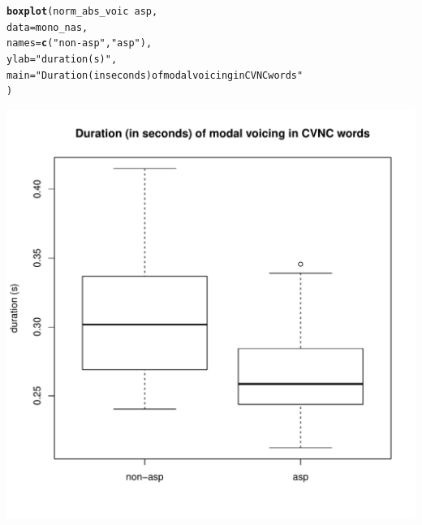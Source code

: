 \documentclass[a4paper,11pt]{article}\usepackage[]{graphicx}\usepackage[]{color}
\makeatletter
\def\maxwidth{ %
  \ifdim\Gin@nat@width>\linewidth
    \linewidth
  \else
    \Gin@nat@width
  \fi
}
\newcommand{\hlstr}[1]{\textcolor[rgb]{0.192,0.494,0.8}{#1}}%
\newcommand{\hlopt}[1]{\textcolor[rgb]{0,0,0}{#1}}%
\newcommand{\hlstd}[1]{\textcolor[rgb]{0.345,0.345,0.345}{#1}}%
\newcommand{\hlkwc}[1]{\textcolor[rgb]{0.333,0.667,0.333}{#1}}%
\newcommand{\hlkwd}[1]{\textcolor[rgb]{0.737,0.353,0.396}{\textbf{#1}}}%
\newenvironment{kframe}{%
 \def\at@end@of@kframe{}%
 \ifinner\ifhmode%
  \def\at@end@of@kframe{\end{minipage}}%
  \begin{minipage}{\columnwidth}%
 \fi\fi%
 \def\FrameCommand##1{\hskip\@totalleftmargin \hskip-\fboxsep
 \colorbox{shadecolor}{##1}\hskip-\fboxsep
     \hskip-\linewidth \hskip-\@totalleftmargin \hskip\columnwidth}%
 \MakeFramed {\advance\hsize-\width
   \@totalleftmargin\z@ \linewidth\hsize
   \@setminipage}}%
 {\par\unskip\endMakeFramed%
 \at@end@of@kframe}
\newenvironment{knitrout}{}{} %
\makeatother
\begin{document}
\begin{knitrout}
\color{fgcolor}\begin{kframe}
\begin{alltt}
\hlkwd{boxplot}\hlstd{(norm_abs_voic} \hlopt{~} \hlstd{asp,}
        \hlkwc{data} \hlstd{= mono_nas,}
        \hlkwc{names} \hlstd{=} \hlkwd{c}\hlstd{(}\hlstr{"non-asp"}\hlstd{,} \hlstr{"asp"}\hlstd{),}
        \hlkwc{ylab} \hlstd{=} \hlstr{"duration (s)"}\hlstd{,}
        \hlkwc{main} \hlstd{=} \hlstr{"Duration (in seconds) of modal voicing in CVNC words"}
        \hlstd{)}
\end{alltt}
\end{kframe}
\includegraphics[width=\maxwidth]{img/mono-nas-box-1} 

\end{knitrout}
\end{document}
